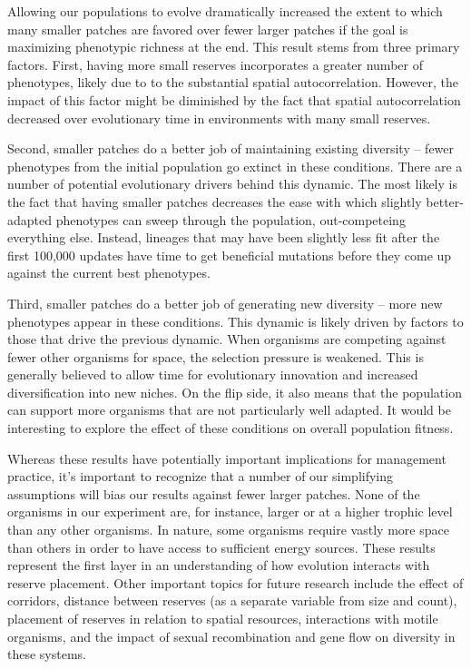 \documentclass[letterpaper]{article}
\begin{document}
Allowing our populations to evolve dramatically increased the extent to which many smaller patches are favored over fewer larger patches if the goal is maximizing phenotypic richness at the end. This result stems from three primary factors. First, having more small reserves incorporates a greater number of phenotypes, likely due to to the substantial spatial autocorrelation. However, the impact of this factor might be diminished by the fact that spatial autocorrelation decreased over evolutionary time in environments with many small reserves. 

	Second, smaller patches do a better job of maintaining existing diversity – fewer phenotypes from the initial population go extinct in these conditions. There are a number of potential evolutionary drivers behind this dynamic. The most likely is the fact that having smaller patches decreases the ease with which slightly better-adapted phenotypes can sweep through the population, out-competeing everything else.  Instead, lineages that may have been slightly less fit after the first 100,000 updates have time to get beneficial mutations before they come up against the current best phenotypes.
    
	Third, smaller patches do a better job of generating new diversity – more new phenotypes appear in these conditions. This dynamic is likely driven by factors to those that drive the previous dynamic. When organisms are competing against fewer other organisms for space, the selection pressure is weakened. This is generally believed to allow time for evolutionary innovation and increased diversification into new niches. On the flip side, it also means that the population can support more organisms that are not particularly well adapted. It would be interesting to explore the effect of these conditions on overall population fitness.
    
	Whereas these results have potentially important implications for management practice, it's important to recognize that a number of our simplifying assumptions will bias our results against fewer larger patches. None of the organisms in our experiment are, for instance, larger or at a higher trophic level than any other organisms. In nature, some organisms require vastly more space than others in order to have access to sufficient energy sources. These results represent the first layer in an understanding of how evolution interacts with reserve placement. Other important topics for future research include the effect of corridors, distance between reserves (as a separate variable from size and count), placement of reserves in relation to spatial resources, interactions with motile organisms, and the impact of sexual recombination and gene flow on diversity in these systems. 
\end{document}
